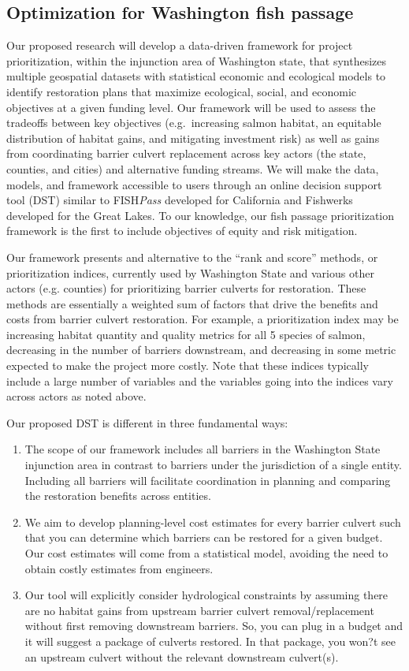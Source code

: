 \documentclass[12pt]{elsarticle}
\begin{document}
\subsection{Optimization for Washington fish passage}

Our proposed research will develop a data-driven framework for project prioritization, within the injunction area of Washington state, that synthesizes multiple geospatial datasets with statistical economic and ecological models to identify restoration plans that maximize ecological, social, and economic objectives at a given funding level. Our framework will be used to assess the tradeoffs between key objectives (e.g.\ increasing salmon habitat, an equitable distribution of habitat gains, and mitigating investment risk) as well as gains from coordinating barrier culvert replacement across key actors (the state, counties, and cities) and alternative funding streams. We will make the data, models, and framework accessible to users through an online decision support tool (DST) similar to FISH\emph{Pass} developed for California and Fishwerks developed for the Great Lakes. To our knowledge, our fish passage prioritization framework is the first to include objectives of equity and risk mitigation. 

Our framework presents and alternative to the ``rank and score'' methods, or prioritization indices, currently used by Washington State and various other actors (e.g. counties) for prioritizing barrier culverts for restoration. These methods are essentially a weighted sum of factors that drive the benefits and costs from barrier culvert restoration. For example, a prioritization index may be increasing habitat quantity and quality metrics for all 5 species of salmon, decreasing in the number of barriers downstream, and decreasing in some metric expected to make the project more costly. Note that these indices typically include a large number of variables and the variables going into the indices vary across actors as noted above. 

Our proposed DST is different in three fundamental ways:

\begin{enumerate}
\item The scope of our framework includes all barriers in the Washington State injunction area in contrast to barriers under the jurisdiction of a single entity. Including all barriers will facilitate coordination in planning and comparing the restoration benefits across entities.
\item We aim to develop planning-level cost estimates for every barrier culvert such that you can determine which barriers can be restored for a given budget. Our cost estimates will come from a statistical model, avoiding the need to obtain costly estimates from engineers. 
\item Our tool will explicitly consider hydrological constraints by assuming there are no habitat gains from upstream barrier culvert removal/replacement without first removing downstream barriers. So, you can plug in a budget and it will suggest a package of culverts restored. In that package, you won?t see an upstream culvert without the relevant downstream culvert(s).
\end{enumerate}
\end{document}
